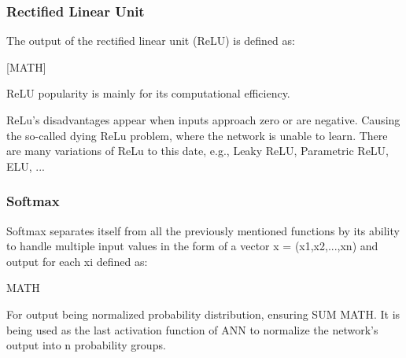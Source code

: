 \subsubsection{Rectified Linear Unit}

The output of the rectified linear unit (ReLU) is defined as:

[MATH]

ReLU popularity is mainly for its computational efficiency.\cite{7typesactivationfunctions}

ReLu's disadvantages appear when inputs approach zero or are negative. Causing the so-called dying ReLu problem, where the network is unable to learn. There are many variations of ReLu to this date, e.g., Leaky ReLU, Parametric ReLU, ELU, ... 

\subsubsection{Softmax}

Softmax separates itself from all the previously mentioned functions by its ability to handle multiple input values in the form of a vector x = (x1,x2,...,xn) and output for each xi defined as:

MATH

For output being normalized probability distribution, ensuring SUM MATH.\cite{lipton2015critical} It is being used as the last activation function of ANN to normalize the network's output into n probability groups.
